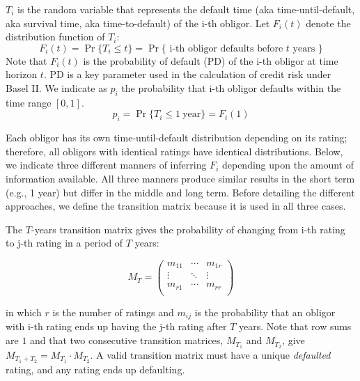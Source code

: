 \documentclass[11pt,fleqn]{book} %
\begin{document}
\begin{definition}
	$T_i$ is the random variable that represents the default time 
	(aka time-until-default, aka survival time, aka time-to-default) of the 
	i-th obligor. Let $F_i(t)$ denote the distribution function of $T_i$:
	\begin{displaymath}
		F_i(t) = \Pr\{T_i \le t\} = 
		\Pr\{\text{ i-th obligor defaults before $t$ years }\}
	\end{displaymath}
	Note that $F_i(t)$ is the probability of default (PD) of the i-th obligor
	at time horizon $t$. PD is a key parameter used in the calculation of credit 
	risk under Basel II\@. We indicate as $p_i$ the probability that i-th obligor 
	defaults within the time range $[0,1]$.
	\begin{displaymath}
		p_i = \Pr\{T_i \le 1\ \text{year}\} = F_i(1) 
	\end{displaymath}
\end{definition}

Each obligor has its own time-until-default distribution depending on its 
rating; therefore, all obligors with identical ratings have identical
distributions. Below, we indicate three different manners of inferring $F_i$ 
depending upon the amount of information available. All three manners produce 
similar results in the short term (e.g., 1 year) but differ in the middle and
long term. Before detailing the different approaches, we define the transition 
matrix because it is used in all three cases.

\begin{definition}
	\label{def:tm}
	The $T$-years transition matrix gives the probability of changing 
	from i-th rating to j-th rating in a period of $T$ years:
	{\small
	\begin{displaymath}
		M_T = \left(
		\begin{array}{ccc}
			m_{11} & \cdots & m_{1r} \\
			\vdots & \ddots & \vdots \\
			m_{r1} & \cdots & m_{rr} \\
		\end{array}
		\right)
	\end{displaymath}\par}
	in which $r$ is the number of ratings and $m_{ij}$ is the probability that 
	an obligor with i-th rating ends up having the j-th rating after $T$ years.
	Note that row sums are $1$ and that two consecutive transition matrices, 
	$M_{T_1}$ and $M_{T_2}$, give $M_{T_1+T_2} = M_{T_1} \cdot M_{T_2}$.
	A valid transition matrix must have a unique \emph{defaulted} rating, and 
	any rating ends up defaulting.
\end{definition}
\end{document}
